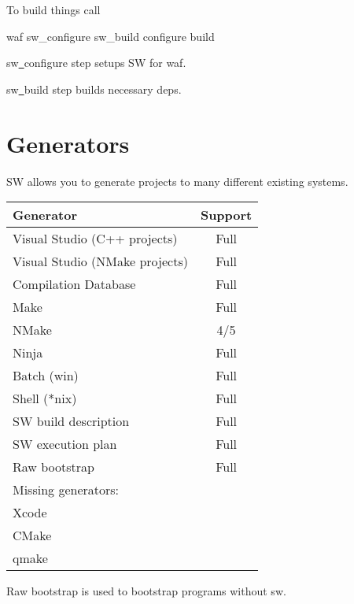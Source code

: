 To build things call

\begin{command}
waf sw_configure sw_build configure build
\end{command}

sw\underline\ configure step setups SW for waf.

sw\underline\ build step builds necessary deps.





\section{Generators}

SW allows you to generate projects to many different existing systems.

\begin{center}
\begin{tabular}{lc}
Generator & Support\\
\hline
Visual Studio (C++ projects) & Full \\
Visual Studio (NMake projects) & Full \\
Compilation Database & Full \\
Make & Full \\
NMake & 4/5 \\ %
Ninja & Full \\
Batch (win) & Full \\
Shell (*nix) & Full \\
SW build description & Full \\
SW execution plan & Full \\
Raw bootstrap & Full \\
\hline

Missing generators: & \\
Xcode & \\
CMake & \\
qmake & \\

\hline
\end{tabular}
\end{center}


Raw bootstrap is used to bootstrap programs without sw.



